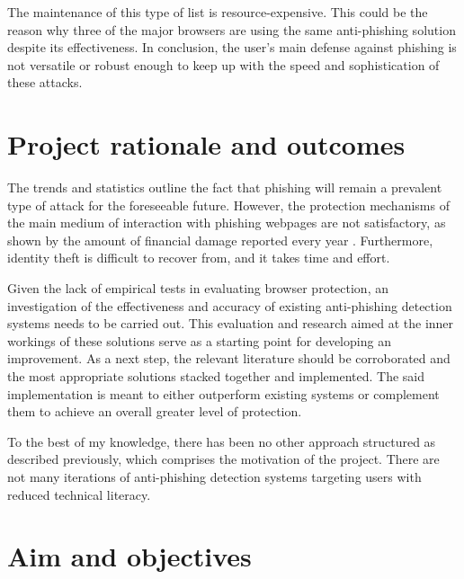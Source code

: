 The maintenance of this type of list is resource-expensive. This could be the reason why three of the major browsers are using the same anti-phishing solution despite its effectiveness. In conclusion, the user's main defense against phishing is not versatile or robust enough to keep up with the speed and sophistication of these attacks.



\section{Project rationale and outcomes}

The trends and statistics outline the fact that phishing will remain a prevalent type of attack for the foreseeable future. However, the protection mechanisms of the main medium of interaction with phishing webpages are not satisfactory, as shown by the amount of financial damage reported every year \citep{APWG_Q42019}. Furthermore, identity theft is difficult to recover from, and it takes time and effort.

Given the lack of empirical tests in evaluating browser protection, an investigation of the effectiveness and accuracy of existing anti-phishing detection systems needs to be carried out. This evaluation and research aimed at the inner workings of these solutions serve as a starting point for developing an improvement. As a next step, the relevant literature should be corroborated and the most appropriate solutions stacked together and implemented. The said implementation is meant to either outperform existing systems or complement them to achieve an overall greater level of protection.

To the best of my knowledge, there has been no other approach structured as described previously, which comprises the motivation of the project. There are not many iterations of anti-phishing detection systems targeting users with reduced technical literacy.

\section{Aim and objectives}

